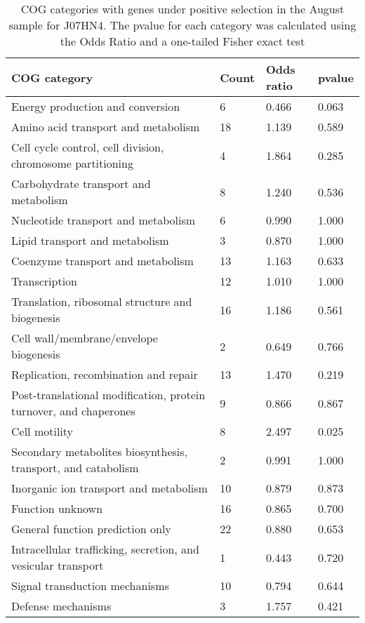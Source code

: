 \begin{table}[hb]
\footnotesize 
	\tabcolsep=0.11cm 
\caption{COG categories with genes under positive selection in the August sample for J07HN4. The pvalue for each category was calculated using the Odds Ratio and a one-tailed Fisher exact test} 
\begin{tabularx}{\textwidth}{L{6cm}R{2cm}R{2cm}R{2cm}} 
\hline 
\textbf{COG category} & \textbf{Count} & \textbf{Odds ratio} & \textbf{pvalue} \\ 
\hline 
Energy production and conversion & 6 & 0.466 & 0.063 \\ 
Amino acid transport and metabolism & 18 & 1.139 & 0.589 \\ 
Cell cycle control, cell division, chromosome partitioning & 4 & 1.864 & 0.285 \\ 
Carbohydrate transport and metabolism & 8 & 1.240 & 0.536 \\ 
Nucleotide transport and metabolism & 6 & 0.990 & 1.000 \\ 
Lipid transport and metabolism & 3 & 0.870 & 1.000 \\ 
Coenzyme transport and metabolism & 13 & 1.163 & 0.633 \\ 
Transcription & 12 & 1.010 & 1.000 \\ 
Translation, ribosomal structure and biogenesis & 16 & 1.186 & 0.561 \\ 
Cell wall/membrane/envelope biogenesis & 2 & 0.649 & 0.766 \\ 
Replication, recombination and repair & 13 & 1.470 & 0.219 \\ 
Post-translational modification, protein turnover, and chaperones & 9 & 0.866 & 0.867 \\ 
Cell motility & 8 & 2.497 & 0.025 \\ 
Secondary metabolites biosynthesis, transport, and catabolism & 2 & 0.991 & 1.000 \\ 
Inorganic ion transport and metabolism & 10 & 0.879 & 0.873 \\ 
Function unknown & 16 & 0.865 & 0.700 \\ 
General function prediction only & 22 & 0.880 & 0.653 \\ 
Intracellular trafficking, secretion, and vesicular transport & 1 & 0.443 & 0.720 \\ 
Signal transduction mechanisms & 10 & 0.794 & 0.644 \\ 
Defense mechanisms & 3 & 1.757 & 0.421 \\ 
\end{tabularx} 
\label{August_COG_Selection_J07HN4} 
 \end{table} 

